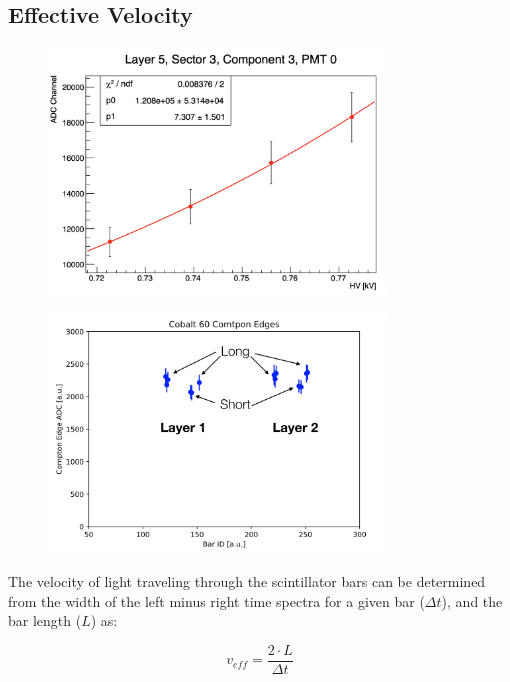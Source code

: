 \documentclass[review]{elsarticle}
\begin{document}
\subsection{Effective Velocity}
\begin{figure}[h!]
\centering
\includegraphics[width=0.8\textwidth]{figures/gainCurve.png}
\caption{}
\end{figure}

\begin{figure}[h!]
\centering
\includegraphics[width=0.8\textwidth]{figures/coedges.png}
\caption{}
\end{figure}



The velocity of light traveling through the scintillator bars 
can be determined from the width of the left minus right time spectra for a given bar ($\Delta t$), and the bar length ($L$) as:

\begin{equation}
v_{eff} = \frac{2 \cdot L}{\Delta t}
\end{equation}
\end{document}
